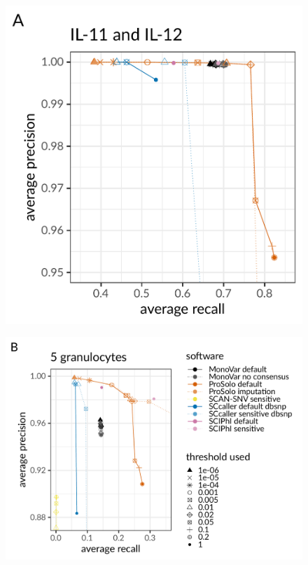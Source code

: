\documentclass[12pt,inline]{wlscirep}
\begin{document}
\begin{figure}[!tpb]
 \begin{minipage}{.40\linewidth}
  \includegraphics[height=40ex]{figs/Dong2017/Dong2017_prosolo-monovar-scansnv-sccaller_precision-recall-plot_focus-tools.pdf} \\
 \end{minipage}
 \begin{minipage}{.55\linewidth}
  \includegraphics[height=40ex]{figs/Laehnemann2017/Laehnemann2017_prosolo-monovar-scansnv-sccaller-sciphi_precision-recall-plot_focus-top-left.pdf} \\
 \end{minipage}


\end{figure}
\end{document}
